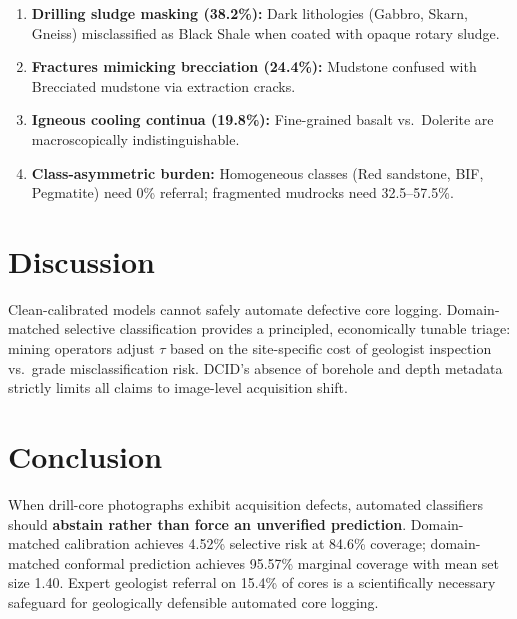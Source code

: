 \documentclass[5p,times,twocolumn]{elsarticle}
\begin{document}
\begin{enumerate}
  \item \textbf{Drilling sludge masking (38.2\%):} Dark lithologies (Gabbro, Skarn,
        Gneiss) misclassified as Black Shale when coated with opaque rotary sludge.
  \item \textbf{Fractures mimicking brecciation (24.4\%):} Mudstone confused with
        Brecciated mudstone via extraction cracks.
  \item \textbf{Igneous cooling continua (19.8\%):} Fine-grained basalt vs.\ Dolerite
        are macroscopically indistinguishable.
  \item \textbf{Class-asymmetric burden:} Homogeneous classes (Red sandstone, BIF,
        Pegmatite) need 0\% referral; fragmented mudrocks need 32.5--57.5\%.
\end{enumerate}

\section{Discussion}
\label{sec:discussion}

Clean-calibrated models cannot safely automate defective core logging. Domain-matched
selective classification provides a principled, economically tunable triage: mining
operators adjust $\tau$ based on the site-specific cost of geologist inspection vs.\
grade misclassification risk. DCID's absence of borehole and depth metadata strictly
limits all claims to image-level acquisition shift.

\section{Conclusion}
\label{sec:conclusion}

When drill-core photographs exhibit acquisition defects, automated classifiers should
\textbf{abstain rather than force an unverified prediction}. Domain-matched calibration
achieves 4.52\% selective risk at 84.6\% coverage; domain-matched conformal prediction
achieves 95.57\% marginal coverage with mean set size 1.40. Expert geologist referral on
15.4\% of cores is a scientifically necessary safeguard for geologically defensible
automated core logging.
\end{document}
